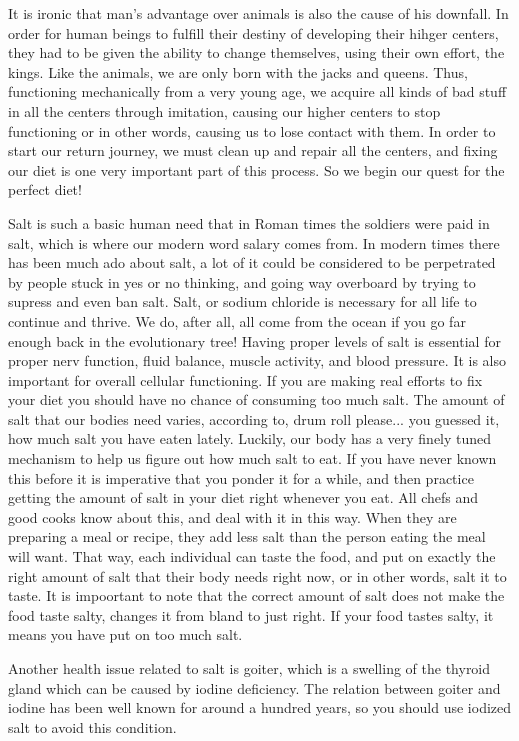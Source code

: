 \documentclass[12pt,letterpaper]{book}
\begin{document}
It is ironic that man's advantage over animals is also the cause of his downfall. In order for human beings to fulfill their destiny of developing their hihger centers, they had to be given the ability to change themselves, using their own effort, the kings. Like the animals, we are only born with the jacks and queens. Thus, functioning mechanically from a very young age, we acquire all kinds of bad stuff in all the centers through imitation, causing our higher centers to stop functioning or in other words, causing us to lose contact with them. In order to start our return journey, we must clean up and repair all the centers, and fixing our diet is one very important part of this process. So we begin our quest for the perfect diet!

Salt is such a basic human need that in Roman times the soldiers were paid in salt, which is where our modern word salary comes from. In modern times there has been much ado about salt, a lot of it could be considered to be perpetrated by people stuck in yes or no thinking, and going way overboard by trying to supress and even ban salt. Salt, or sodium chloride is necessary for all life to continue and thrive. We do, after all, all come from the ocean if you go far enough back in the evolutionary tree! Having proper levels of salt is essential for proper nerv function, fluid balance, muscle activity, and blood pressure. It is also important for overall cellular functioning. If you are making real efforts to fix your diet you should have no chance of consuming too much salt. The amount of salt that our bodies need varies, according to, drum roll please... you guessed it, how much salt you have eaten lately. Luckily, our body has a very finely tuned mechanism to help us figure out how much salt to eat. If you have never known this before it is imperative that you ponder it for a while, and then practice getting the amount of salt in your diet right whenever you eat. All chefs and good cooks know about this, and deal with it in this way. When they are preparing a meal or recipe, they add less salt than the person eating the meal will want. That way, each individual can taste the food, and put on exactly the right amount of salt that their body needs right now, or in other words, salt it to taste. It is impoortant to note that the correct amount of salt does not make the food taste salty, changes it from bland to just right. If your food tastes salty, it means you have put on too much salt.

Another health issue related to salt is goiter, which is a swelling of the thyroid gland which can be caused by iodine deficiency. The relation between goiter and iodine has been well known for around a hundred years, so you should use iodized salt to avoid this condition. 
\end{document}
